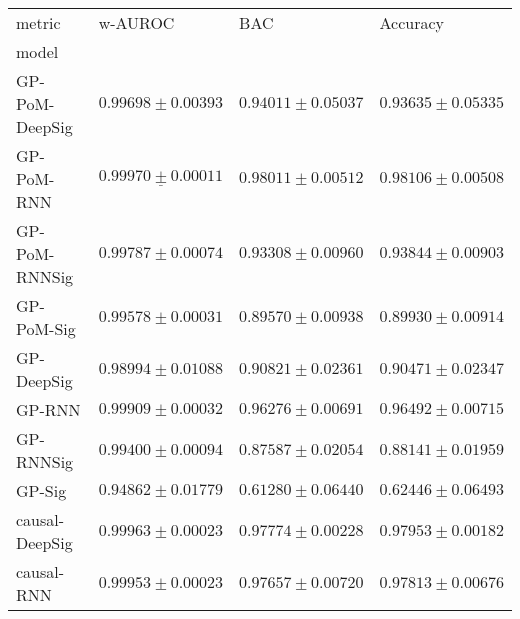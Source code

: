 \begin{tabular}{llll}
\toprule
metric &                                           w-AUROC &                                               BAC &                                          Accuracy \\
model          &                                                   &                                                   &                                                   \\
\midrule
GP-PoM-DeepSig &                           $ 0.99698 \pm 0.00393 $ &                           $ 0.94011 \pm 0.05037 $ &                           $ 0.93635 \pm 0.05335 $ \\
GP-PoM-RNN     &            $  \underline{ 0.99970 \pm 0.00011 } $ &                           $ 0.98011 \pm 0.00512 $ &                           $ 0.98106 \pm 0.00508 $ \\
GP-PoM-RNNSig  &                           $ 0.99787 \pm 0.00074 $ &                           $ 0.93308 \pm 0.00960 $ &                           $ 0.93844 \pm 0.00903 $ \\
GP-PoM-Sig     &                           $ 0.99578 \pm 0.00031 $ &                           $ 0.89570 \pm 0.00938 $ &                           $ 0.89930 \pm 0.00914 $ \\
GP-DeepSig     &                           $ 0.98994 \pm 0.01088 $ &                           $ 0.90821 \pm 0.02361 $ &                           $ 0.90471 \pm 0.02347 $ \\
GP-RNN         &                           $ 0.99909 \pm 0.00032 $ &                           $ 0.96276 \pm 0.00691 $ &                           $ 0.96492 \pm 0.00715 $ \\
GP-RNNSig      &                           $ 0.99400 \pm 0.00094 $ &                           $ 0.87587 \pm 0.02054 $ &                           $ 0.88141 \pm 0.01959 $ \\
GP-Sig         &                           $ 0.94862 \pm 0.01779 $ &                           $ 0.61280 \pm 0.06440 $ &                           $ 0.62446 \pm 0.06493 $ \\
causal-DeepSig &                           $ 0.99963 \pm 0.00023 $ &                           $ 0.97774 \pm 0.00228 $ &                           $ 0.97953 \pm 0.00182 $ \\
causal-RNN     &                           $ 0.99953 \pm 0.00023 $ &                           $ 0.97657 \pm 0.00720 $ &                           $ 0.97813 \pm 0.00676 $ \\

\end{tabular}
